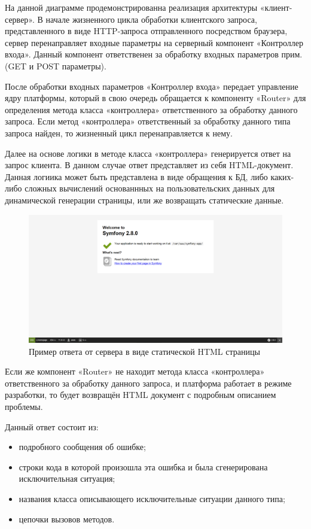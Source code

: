 На данной диаграмме продемонстрированна  реализация архитектуры «клиент-сервер». В начале жизненного цикла обработки клиентского запроса, представленного в виде HTTP-запроса отправленного посредством браузера, сервер перенаправляет входные параметры  на серверный компонент «Контроллер входа». Данный компонент ответственен за обработку входных параметров прим.(GET и POST параметры).

После обработки входных параметров «Контроллер входа» передает управление ядру платформы, который в свою очередь обращается к компоненту «Router» для определения метода класса «контроллера» ответственного за обработку данного запроса. Если метод «контроллера» ответственный за обработку данного типа запроса найден, то жизненный цикл перенаправляется к нему. 

Далее на основе логики в методе класса «контроллера» генерируется ответ на запрос клиента. В данном случае ответ представляет из себя HTML-документ. Данная логиика может быть представлена в виде обращения к БД, либо каких-либо сложных вычислений основаннных на пользовательских данных для динамической генерации страницы, или же возвращать статические данные.
 
\begin{figure}[ht]
\centering
  \includegraphics[scale=0.3]{images/welcome.png}  
  \caption{  Пример ответа от сервера в виде статической HTML страницы }
  \label{fig:domain:symfony_request_workflow}
\end{figure}

Если же компонент «Router» не находит метода класса «контроллера» ответственного за обработку данного запроса, и платформа работает в режиме разработки, то будет возвращён HTML документ с подробным описанием проблемы. 


Данный ответ состоит из:

\begin{itemize}
  \item подробного сообщения об ошибке;
  \item строки кода в которой произошла эта ошибка и была сгенерирована исключительная ситуация;
  \item названия класса описывающего исключительные ситуации данного типа;
  \item цепочки вызовов методов. 
\end{itemize}


